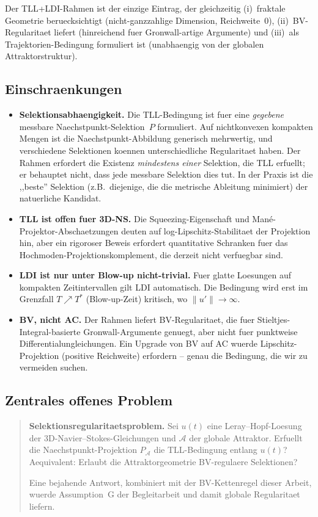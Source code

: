 \documentclass[12pt,a4paper]{article}
\theoremstyle{definition}
\theoremstyle{plain}
\theoremstyle{remark}
\begin{document}
\noindent
Der TLL+LDI-Rahmen ist der einzige Eintrag, der gleichzeitig
(i)~fraktale Geometrie beruecksichtigt (nicht-ganzzahlige Dimension,
Reichweite~$0$), (ii)~BV-Regularitaet liefert (hinreichend fuer
Gronwall-artige Argumente) und (iii)~als Trajektorien-Bedingung
formuliert ist (unabhaengig von der globalen Attraktorstruktur).

\subsection{Einschraenkungen}

\begin{itemize}
  \item \textbf{Selektionsabhaengigkeit.}\;
    Die TLL-Bedingung ist fuer eine \emph{gegebene} messbare
    Naechstpunkt-Selektion~$P$ formuliert.  Auf nichtkonvexen
    kompakten Mengen ist die Naechstpunkt-Abbildung generisch
    mehrwertig, und verschiedene Selektionen koennen unterschiedliche
    Regularitaet haben.  Der Rahmen erfordert die Existenz
    \emph{mindestens einer} Selektion, die TLL erfuellt; er
    behauptet nicht, dass jede messbare Selektion dies tut.
    In der Praxis ist die ,,beste'' Selektion (z.B.\ diejenige,
    die die metrische Ableitung minimiert) der natuerliche Kandidat.
  \item \textbf{TLL ist offen fuer 3D-NS.}\;
    Die Squeezing-Eigenschaft und Man\'e-Projektor-Abschaetzungen
    deuten auf log-Lipschitz-Stabilitaet der Projektion hin, aber ein
    rigoroser Beweis erfordert quantitative Schranken fuer das
    Hochmoden-Projektionskomplement, die derzeit nicht verfuegbar sind.
  \item \textbf{LDI ist nur unter Blow-up nicht-trivial.}\;
    Fuer glatte Loesungen auf kompakten Zeitintervallen gilt LDI
    automatisch.  Die Bedingung wird erst im Grenzfall
    $T \nearrow T^*$ (Blow-up-Zeit) kritisch, wo $\|u'\| \to \infty$.
  \item \textbf{BV, nicht AC.}\;
    Der Rahmen liefert BV-Regularitaet, die fuer
    Stieltjes-Integral-basierte Gronwall-Argumente genuegt, aber nicht
    fuer punktweise Differentialungleichungen.  Ein Upgrade von BV auf
    AC wuerde Lipschitz-Projektion (positive Reichweite) erfordern --
    genau die Bedingung, die wir zu vermeiden suchen.
\end{itemize}


\subsection*{Zentrales offenes Problem}
\begin{quote}
\textbf{Selektionsregularitaetsproblem.}
Sei $u(t)$ eine Leray--Hopf-Loesung der 3D-Navier--Stokes-Gleichungen und $\mathcal{A}$ der globale Attraktor. Erfuellt die Naechstpunkt-Projektion $P_\mathcal{A}$ die TLL-Bedingung entlang $u(t)$? Aequivalent: Erlaubt die Attraktorgeometrie BV-regulaere Selektionen?

Eine bejahende Antwort, kombiniert mit der BV-Kettenregel dieser Arbeit, wuerde Assumption~G der Begleitarbeit \cite{FST-NS2026} und damit globale Regularitaet liefern.
\end{quote}
\end{document}
